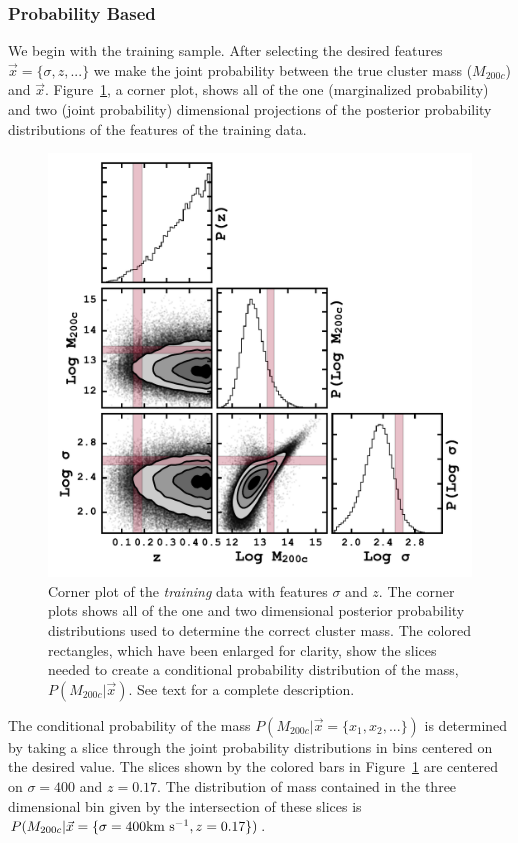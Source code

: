 \documentclass[fleqn,usenatbib]{mnras}
\begin{document}
\subsubsection{Probability Based}\label{sec:probability method}
We begin with the training sample. After selecting the desired features $\vec{x} = \{\sigma, z, ...\}$ we make the joint probability between the true cluster mass ($M_{200c}$) and $\vec{x}$. Figure~\ref{fig: probability corner}, a corner plot, shows all of the one (marginalized probability) and two (joint probability) dimensional projections of the posterior probability distributions of the features of the training data.

\begin{figure} 
	\includegraphics[width=\columnwidth]{figures/cornertest.pdf} 
	\caption{Corner plot of the \emph{training} data with features $\sigma$ and $z$. The corner plots shows all of the one and two dimensional posterior probability distributions used to determine the correct cluster mass. The colored rectangles, which have been enlarged for clarity, show the slices needed to create a conditional probability distribution of the mass, $P(M_{200c}|\vec{x})$. See text for a complete description. } \label{fig: probability corner} 
\end{figure}

The conditional probability of the mass $P(M_{200c}|\vec{x}= \{ x_1,x_2,...\})$ is determined by taking a slice through the joint probability distributions in bins centered on the desired value. The slices shown by the colored bars in Figure~\ref{fig: probability corner} are centered on $\sigma = 400$ \kms and $z=0.17$. The distribution of mass contained in the three dimensional bin given by the intersection of these slices is $P(M_{200c}|\vec{x} = \{\sigma=400 \hbox{km~s$^{-1}$},z=0.17\})$.
\end{document}
